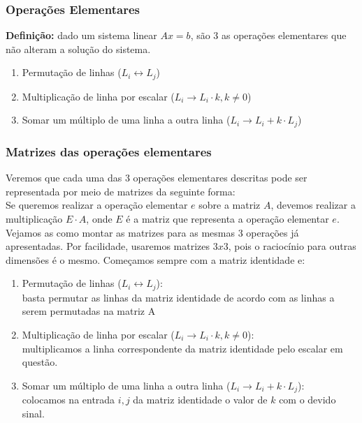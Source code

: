 \documentclass[12pt]{article}
\begin{document}
\subsubsection{Operações Elementares}

\textbf{Definição:}
dado um sistema linear $Ax=b$, são 3 as operações elementares que não alteram a solução do sistema.
\begin{enumerate}
	\item Permutação de linhas ($L_i\leftrightarrow L_j$)
	\item Multiplicação de linha por escalar ($L_i\rightarrow L_i \cdot k,k \neq 0$)
	\item Somar um múltiplo de uma linha a outra linha ($L_i \rightarrow L_i+k\cdot L_j$)
\end{enumerate}

\subsubsection{Matrizes das operações elementares}

Veremos que cada uma das 3 operações elementares descritas pode ser representada por meio de matrizes da seguinte forma:\\

Se queremos realizar a operação elementar $e$ sobre a matriz $A$, devemos realizar a multiplicação $E\cdot A$, onde $E$ é a matriz que representa a operação elementar $e$. \\

Vejamos as como montar as matrizes para as mesmas 3 operações já apresentadas. Por facilidade, usaremos matrizes $3x3$, pois o raciocínio para outras dimensões é o mesmo. Começamos sempre com a matriz identidade e:
\begin{enumerate}
	\item Permutação de linhas ($L_i\leftrightarrow L_j$):\\ basta permutar as linhas da matriz identidade de acordo com as linhas a serem permutadas na matriz A
	\item Multiplicação de linha por escalar ($L_i\rightarrow L_i \cdot k,k \neq 0$):\\ multiplicamos a linha correspondente da matriz identidade pelo escalar em questão.
	\item Somar um múltiplo de uma linha a outra linha ($L_i \rightarrow L_i+k\cdot L_j$):\\ colocamos na entrada $i,j$ da matriz identidade o valor de $k$ com o devido sinal.
\end{enumerate}
\end{document}
